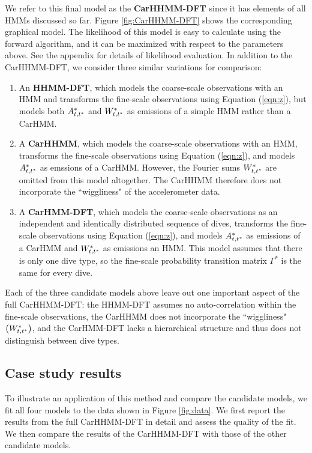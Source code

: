 We refer to this final model as the \textbf{CarHHMM-DFT} since it has elements of all HMMs discussed so far. Figure \ref{fig:CarHHMM-DFT} shows the corresponding graphical model. The likelihood of this model is easy to calculate using the forward algorithm, and it can be maximized with respect to the parameters above. See the appendix for details of likelihood evaluation. In addition to the CarHHMM-DFT, we consider three similar variations for comparison:
\begin{enumerate}
    \item An \textbf{HHMM-DFT}, which models the coarse-scale observations with an HMM and transforms the fine-scale observations using Equation (\ref{eqn:z}), but models both $A^*_{t,t^*}$ and $W^*_{t,t^*}$ as emissions of a simple HMM rather than a CarHMM.
    \item A \textbf{CarHHMM}, which models the coarse-scale observations with an HMM, transforms the fine-scale observations using Equation (\ref{eqn:z}), and models $A^*_{t,t^*}$ as emssions of a CarHMM. However, the Fourier sums $W^*_{t,t^*}$ are omitted from this model altogether. The CarHHMM therefore does not incorporate the ``wiggliness" of the accelerometer data.
    \item A \textbf{CarHMM-DFT}, which models the coarse-scale observations as an independent and identically distributed sequence of dives, transforms the fine-scale observations using Equation (\ref{eqn:z}), and models $A^*_{t,t^*}$ as emissions of a CarHMM and $W^*_{t,t^*}$ as emissions an HMM. This model assumes that there is only one dive type, so the fine-scale probability transition matrix $\Gamma^*$ is the same for every dive. 
\end{enumerate}
%
Each of the three candidate models above leave out one important aspect of the full CarHHMM-DFT: the HHMM-DFT assumes no auto-correlation within the fine-scale observations, the CarHHMM does not incorporate the ``wiggliness" $\big(W^*_{t,t^*}\big)$, and the CarHMM-DFT lacks a hierarchical structure and thus does not distinguish between dive types.

\subsection{Case study results}

To illustrate an application of this method and compare the candidate models, we fit all four models to the data shown in Figure \ref{fig:data}. We first report the results from the full CarHHMM-DFT in detail and assess the quality of the fit. We then compare the results of the CarHHMM-DFT with those of the other candidate models.

